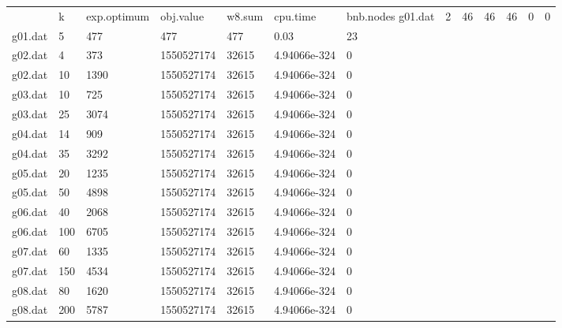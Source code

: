 \begin{tabular}{ c | l | l | l | l | l | l }
	\Instance & k & exp.optimum & obj.value & w8.sum & cpu.time & bnb.nodes 
	\hline
	g01.dat & 2 & 46 & 46 & 46 & 0 & 0\\
	g01.dat & 5 & 477 & 477 & 477 & 0.03 & 23\\
	g02.dat & 4 & 373 & 1550527174 & 32615 & 4.94066e-324 & 0\\
	g02.dat & 10 & 1390 & 1550527174 & 32615 & 4.94066e-324 & 0\\
	g03.dat & 10 & 725 & 1550527174 & 32615 & 4.94066e-324 & 0\\
	g03.dat & 25 & 3074 & 1550527174 & 32615 & 4.94066e-324 & 0\\
	g04.dat & 14 & 909 & 1550527174 & 32615 & 4.94066e-324 & 0\\
	g04.dat & 35 & 3292 & 1550527174 & 32615 & 4.94066e-324 & 0\\
	g05.dat & 20 & 1235 & 1550527174 & 32615 & 4.94066e-324 & 0\\
	g05.dat & 50 & 4898 & 1550527174 & 32615 & 4.94066e-324 & 0\\
	g06.dat & 40 & 2068 & 1550527174 & 32615 & 4.94066e-324 & 0\\
	g06.dat & 100 & 6705 & 1550527174 & 32615 & 4.94066e-324 & 0\\
	g07.dat & 60 & 1335 & 1550527174 & 32615 & 4.94066e-324 & 0\\
	g07.dat & 150 & 4534 & 1550527174 & 32615 & 4.94066e-324 & 0\\
	g08.dat & 80 & 1620 & 1550527174 & 32615 & 4.94066e-324 & 0\\
	g08.dat & 200 & 5787 & 1550527174 & 32615 & 4.94066e-324 & 0\\
\end{tabular}
